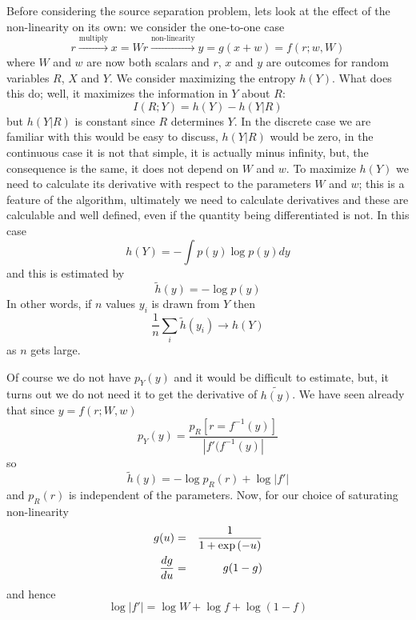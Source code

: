 \documentclass[12pt]{article}
\begin{document}
Before considering the source separation problem, lets look at the
effect of the non-linearity on its own: we consider the one-to-one
case
\begin{equation}
r\stackrel{\mbox{multiply}}{\longrightarrow}x=Wr\stackrel{\mbox{non-linearity}}{\longrightarrow}y=g(x+w)=f(r;w,W)
\end{equation}
where $W$ and $w$ are now both scalars and $r$, $x$ and $y$ are
outcomes for random variables $R$, $X$ and $Y$. We consider maximizing
the entropy $h(Y)$. What does this do; well, it maximizes the
information in $Y$ about $R$:
\begin{equation}
I(R;Y)=h(Y)-h(Y|R)
\end{equation}
but $h(Y|R)$ is constant since $R$ determines $Y$. In the discrete
case we are familiar with this would be easy to discuss, $h(Y|R)$
would be zero, in the continuous case it is not that simple, it is
actually minus infinity, but, the consequence is the same, it does not
depend on $W$ and $w$. To maximize $h(Y)$ we need to calculate its
derivative with respect to the parameters $W$ and $w$; this is a
feature of the algorithm, ultimately we need to calculate derivatives
and these are calculable and well defined, even if the quantity being
differentiated is not. In this case
\begin{equation}
h(Y)=-\int p(y)\log{p(y)} dy
\end{equation}
and this is estimated by
\begin{equation}
\tilde{h}(y)=-\log{p(y)}
\end{equation}
In other words, if $n$ values $y_i$ is drawn from $Y$ then 
\begin{equation}
\frac{1}{n}\sum_i\tilde{h}(y_i)\rightarrow h(Y)
\end{equation}
as $n$ gets large. 

Of course we do not have $p_Y(y)$ and it would be difficult to
estimate, but, it turns out we do not need it to get the derivative of
$\tilde{h(y)}$. We have seen already that since $y=f(r;W,w)$
\begin{equation}
p_Y(y)=\frac{p_R[r=f^{-1}(y)]}{|f'(f^{-1}(y)|}
\end{equation}
so
\begin{equation}
\tilde{h}(y)=-\log{p_R(r)}+\log{|f'|}
\end{equation}
and $p_R(r)$ is independent of the parameters. Now, for our choice of saturating non-linearity
\begin{eqnarray}
g(u)&=&\frac{1}{1+\exp{(-u)}}\cr
\frac{dg}{du}&=&g(1-g)
\end{eqnarray}
and hence
\begin{equation}
\log{|f'|}=\log{W}+\log{f}+\log{(1-f)}
\end{equation}
\end{document}
